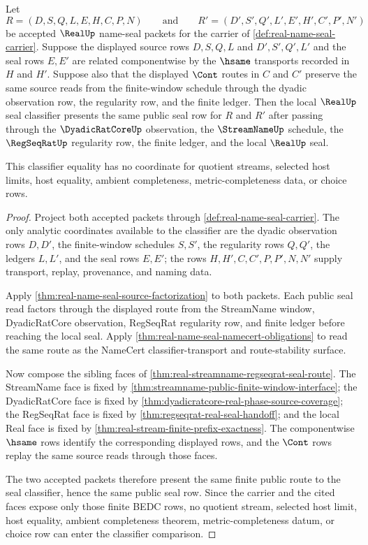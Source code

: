 \begin{theorem}
\label{thm:real-name-seal-classifier-stability}
Let
$$
R=(D,S,Q,L,E,H,C,P,N)
\qquad\text{and}\qquad
R'=(D',S',Q',L',E',H',C',P',N')
$$
be accepted $\RealUp$ name-seal packets for the carrier of \autoref{def:real-name-seal-carrier}. Suppose the displayed source rows $D,S,Q,L$ and $D',S',Q',L'$ and the seal rows $E,E'$ are related componentwise by the $\hsame$ transports recorded in $H$ and $H'$. Suppose also that the displayed $\Cont$ routes in $C$ and $C'$ preserve the same source reads from the finite-window schedule through the dyadic observation row, the regularity row, and the finite ledger. Then the local $\RealUp$ seal classifier presents the same public seal row for $R$ and $R'$ after passing through the $\DyadicRatCoreUp$ observation, the $\StreamNameUp$ schedule, the $\RegSeqRatUp$ regularity row, the finite ledger, and the local $\RealUp$ seal.

This classifier equality has no coordinate for quotient streams, selected host limits, host equality, ambient completeness, metric-completeness data, or choice rows.
\end{theorem}
\begin{proof}
Project both accepted packets through \autoref{def:real-name-seal-carrier}. The only analytic coordinates available to the classifier are the dyadic observation rows $D,D'$, the finite-window schedules $S,S'$, the regularity rows $Q,Q'$, the ledgers $L,L'$, and the seal rows $E,E'$; the rows $H,H',C,C',P,P',N,N'$ supply transport, replay, provenance, and naming data.

Apply \autoref{thm:real-name-seal-source-factorization} to both packets. Each public seal read factors through the displayed route from the StreamName window, DyadicRatCore observation, RegSeqRat regularity row, and finite ledger before reaching the local seal. Apply \autoref{thm:real-name-seal-namecert-obligations} to read the same route as the NameCert classifier-transport and route-stability surface.

Now compose the sibling faces of \autoref{thm:real-streamname-regseqrat-seal-route}. The StreamName face is fixed by \autoref{thm:streamname-public-finite-window-interface}; the DyadicRatCore face is fixed by \autoref{thm:dyadicratcore-real-phase-source-coverage}; the RegSeqRat face is fixed by \autoref{thm:regseqrat-real-seal-handoff}; and the local Real face is fixed by \autoref{thm:real-stream-finite-prefix-exactness}. The componentwise $\hsame$ rows identify the corresponding displayed rows, and the $\Cont$ rows replay the same source reads through those faces.

The two accepted packets therefore present the same finite public route to the seal classifier, hence the same public seal row. Since the carrier and the cited faces expose only those finite BEDC rows, no quotient stream, selected host limit, host equality, ambient completeness theorem, metric-completeness datum, or choice row can enter the classifier comparison.
\end{proof}

